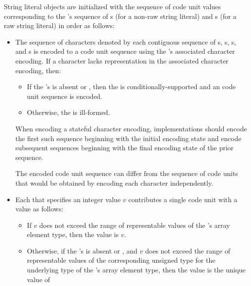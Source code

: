 \pnum
String literal objects are initialized with
the sequence of code unit values
corresponding to the 's sequence of
s (for a non-raw string literal) and
s (for a raw string literal)
in order as follows:
\begin{itemize}
\item
The sequence of characters denoted by each contiguous sequence of
s,
s,
s, and
s
is encoded to a code unit sequence
using the 's associated character encoding.
If a character lacks representation in the associated character encoding, then:
\begin{itemize}
\item
If the 's 
is absent or ,
then the  is conditionally-supported and
an
code unit sequence is encoded.
\item
Otherwise, the  is ill-formed.
\end{itemize}
When encoding a stateful character encoding,
implementations should encode the first such sequence
beginning with the initial encoding state and
encode subsequent sequences
beginning with the final encoding state of the prior sequence.
\begin{note}
The encoded code unit sequence can differ from
the sequence of code units that would be obtained by
encoding each character independently.
\end{note}
\item
Each 
that specifies an integer value $v$
contributes a single code unit with a value as follows:
\begin{itemize}
\item
If $v$ does not exceed the range of representable values of
the 's array element type,
then the value is $v$.
\item
Otherwise,
if the 's 
is absent or , and
$v$ does not exceed the range of representable values of
the corresponding unsigned type for the underlying type of
the 's array element type,
then the value is the unique value of

\end{itemize}
\end{itemize}

